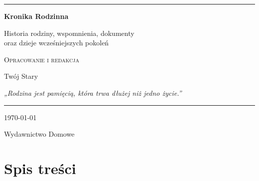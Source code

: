 \documentclass{book}
\begin{document}
\begin{titlepage}
    \centering

    \vspace*{2cm}

    \rule{\textwidth}{0.8pt}
    \vspace{1.2cm}

    {\Huge\bfseries
    Kronika Rodzinna\par}

    \vspace{0.6cm}

    {\Large
    Historia rodziny, wspomnienia, dokumenty\\
    oraz dzieje wcześniejszych pokoleń\par}

    \vspace{1.5cm}

    {\large\textsc{Opracowanie i redakcja}}\par
    \vspace{0.4cm}

    {\LARGE Twój Stary\par}

    \vfill

     \begin{minipage}{0.78\textwidth}
        \centering
        \itshape
        „Rodzina jest pamięcią, która trwa dłużej niż jedno życie.”
    \end{minipage}

    \vfill

    \rule{\textwidth}{0.8pt}

    \vspace{0.5cm}

    {\large
    \today\par}

    \vspace{0.3cm}

    {\small
    Wydawnictwo Domowe}

\end{titlepage}
\newpage


\chapter*{Spis treści}

\end{document}
